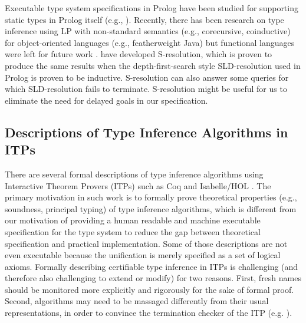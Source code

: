 Executable type system specifications in Prolog have been studied for supporting
static types in Prolog itself (e.g., \cite{SchrijversCWD08}). Recently, there
has been research on type inference using LP with non-standard semantics (e.g.,
corecursive, coinductive) for object-oriented languages (e.g., featherweight
Java) but functional languages were left for future work \cite{AL-ECOOP09}.
\citet{SRLP15} have developed S-resolution, which is proven \cite{PCR15} to
produce the same results when the depth-first-search style SLD-resolution
used in Prolog is proven to be inductive. S-resolution can also answer
some queries for which SLD-resolution fails to terminate.
S-resolution might be useful for us to eliminate the need for delayed goals
in our specification.

\subsection{Descriptions of Type Inference Algorithms in ITPs}
There are several formal descriptions of type inference algorithms using
Interactive Theorem Provers (ITPs) such as Coq \cite{Dubois00} and
Isabelle/HOL \cite{UrbanN2009}. The primary motivation %
in such work is to formally prove theoretical properties (e.g., soundness,
principal typing) of type inference algorithms, which is different from
our motivation of providing a human readable and machine executable
specification for the type system to reduce the gap between
theoretical specification and practical implementation. Some of those
descriptions  are not even executable because the unification is merely
specified as a set of logical axioms.
Formally describing certifiable type inference in ITPs is challenging
(and therefore also challenging to extend or modify) for two reasons.
First, fresh names should be monitored more explicitly and rigorously for
the sake of formal proof. Second, algorithms may need to be massaged
differently from their usual representations, in order to convince
the termination checker of the ITP (e.g. \cite{JFP:185139}).

